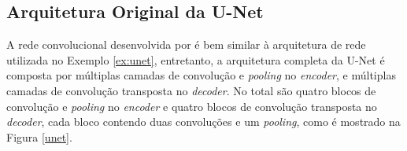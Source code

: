 

\subsection{Arquitetura Original da U-Net}
\label{sec1:unet}
A rede convolucional desenvolvida por  é bem similar à arquitetura de rede utilizada no Exemplo \ref{ex:unet}, entretanto, a arquitetura completa da U-Net é composta por múltiplas camadas de convolução e \textit{pooling} no \textit{encoder}, e múltiplas camadas de convolução transposta no \textit{decoder}. No total são quatro blocos de convolução e \textit{pooling} no \textit{encoder} e quatro blocos de convolução transposta no \textit{decoder}, cada bloco contendo duas convoluções e um \textit{pooling}, como é mostrado na Figura \ref{unet}. 

